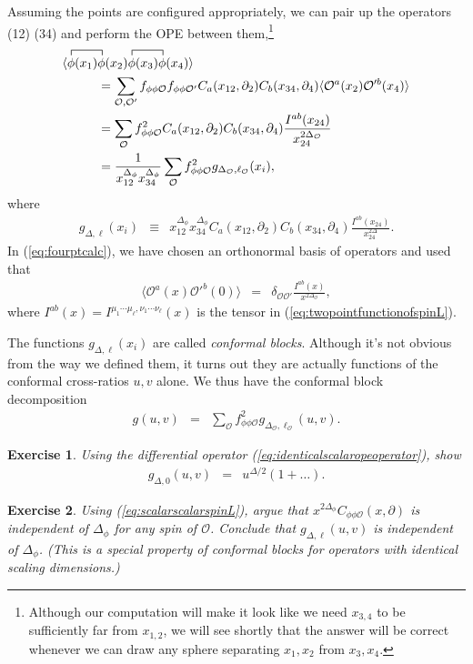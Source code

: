 \documentclass[11pt]{ws-rv9x6}
\newcommand\be{\begin{eqnarray}}
\newcommand\ee{\end{eqnarray}}
\newcommand\f\phi
\newcommand\cO{\mathcal{O}}
\newcommand\p[1]{\left(#1\right)}
\newcommand\ptl\partial
\newcommand\<\langle
\renewcommand\>\rangle
\newcommand\de\delta
\newcommand\nn{\nonumber}
\renewcommand\.{\cdot}
\newcommand\De{\Delta}
\newtheorem{exercise}{Exercise}[section]
\begin{document}
Assuming the points are configured appropriately, we can pair up the operators (12) (34) and perform the OPE between them,\footnote{Although our computation will make it look like we need $x_{3,4}$ to be sufficiently far from $x_{1,2}$, we will see shortly that the answer will be correct whenever we can draw any sphere separating $x_1,x_2$ from $x_3,x_4$.}
\begin{align}
\label{eq:fourptcalc}
\<
\contraction{}{\f}{(x_1)}{\f}
\f(x_1)&\f(x_2)
\contraction{}{\f}{(x_1)}{\f}
\f(x_3)\f(x_4)
\>\nn\\
&= \sum_{\cO,\cO'}f_{\f\f\cO}f_{\f\f\cO'} C_a(x_{12},\ptl_2)C_b(x_{34},\ptl_4)\<\cO^a(x_2)\cO'^b(x_4)\>\nn\\
&= \sum_\cO f_{\f\f\cO}^2 C_a(x_{12},\ptl_2)C_b(x_{34},\ptl_4)\frac{I^{ab}(x_{24})}{x_{24}^{2\De_\cO}}\nn\\
&= \frac{1}{x_{12}^{\De_\f} x_{34}^{\De_\f}}\sum_\cO f_{\f\f\cO}^2 g_{\De_\cO,\ell_\cO}(x_i),
\end{align}
where
\be
\label{eq:olddefinitionofg}
g_{\De,\ell}(x_i) &\equiv& x_{12}^{\De_\f} x_{34}^{\De_\f} C_a(x_{12},\ptl_2)C_b(x_{34},\ptl_4)\frac{I^{ab}(x_{24})}{x_{24}^{2\De}}.
\ee
In (\ref{eq:fourptcalc}), we have chosen an orthonormal basis of operators and used that
\be
\label{eq:canonicallynormalizedtwopt}
\<\cO^a(x)\cO'^b(0)\> &=& \de_{\cO\cO'} \frac{I^{ab}(x)}{x^{2\De_\cO}},
\ee
where $I^{ab}(x)=I^{\mu_1\cdots\mu_\ell,\nu_1\cdots\nu_\ell}(x)$ is the tensor in (\ref{eq:twopointfunctionofspinL}).

The functions $g_{\De,\ell}(x_i)$ are called {\it conformal blocks}.  Although it's not obvious from the way we defined them, it turns out they are actually functions of the conformal cross-ratios $u,v$ alone.  We thus have the conformal block decomposition
\be
g(u,v) &=& \sum_\cO f_{\f\f\cO}^2 g_{\De_\cO,\ell_\cO}(u,v).
\ee
\begin{exercise}
Using the differential operator (\ref{eq:identicalscalaropeoperator}), show
\be
\label{eq:boundaryconditionforblock}
g_{\De,0}(u,v) &=& u^{\De/2}\p{1+\dots}.
\ee
\end{exercise}

\begin{exercise}
Using (\ref{eq:scalarscalarspinL}), argue that $x^{2\De_\f} C_{\f\f\cO}(x,\ptl)$ is independent of $\Delta_\phi$ for any spin of $\cO$. Conclude that $g_{\De,\ell}(u,v)$ is independent of $\Delta_\phi$. (This is a special property of conformal blocks for operators with identical scaling dimensions.)
\end{exercise}
\end{document}
